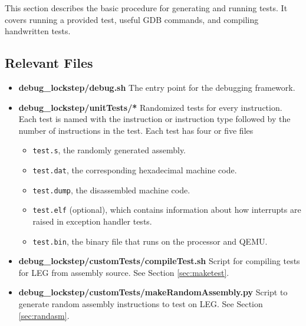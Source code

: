 This section describes the basic procedure for generating and running tests. 
It covers running a provided test, useful GDB commands, and compiling handwritten tests.

\subsection{Relevant Files}
\begin{itemize}
\item \textbf{debug\_lockstep/debug.sh} The entry point for the debugging framework. 
\item \textbf{debug\_lockstep/unitTests/*} Randomized tests for every instruction. 
Each test is named with the instruction or instruction type followed by the number of instructions in the test. 
Each test has four or five files
\begin{itemize}
\item \texttt{test.s}, the randomly generated assembly.
\item\texttt{test.dat}, the corresponding hexadecimal machine code.
\item \texttt{test.dump}, the disassembled machine code.
\item \texttt{test.elf} (optional), which contains information about how interrupts are raised in exception handler tests.
\item \texttt{test.bin}, the binary file that runs on the processor and QEMU.
\end{itemize}

\item \textbf{debug\_lockstep/customTests/compileTest.sh} Script for compiling tests for LEG from assembly source. See Section \ref{sec:maketest}.

\item \textbf{debug\_lockstep/customTests/makeRandomAssembly.py} Script to generate random assembly instructions to test on LEG. See Section \ref{sec:randasm}.
\end{itemize}

